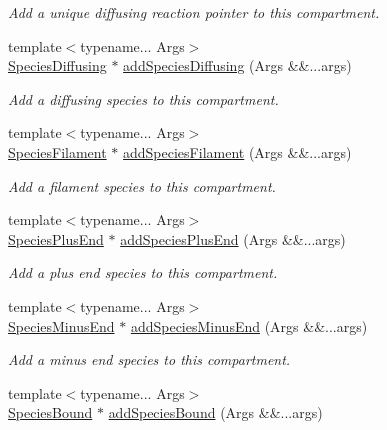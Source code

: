 \begin{DoxyCompactItemize}
\begin{DoxyCompactList}\small\item\em Add a unique diffusing reaction pointer to this compartment. \end{DoxyCompactList}\item 
{\footnotesize template$<$typename... Args$>$ }\\\hyperlink{classSpeciesDiffusing}{Species\+Diffusing} $\ast$ \hyperlink{classCompartment_ac03fcd8679f2ed9e3aebae8732d9ceeb}{add\+Species\+Diffusing} (Args \&\&...args)
\begin{DoxyCompactList}\small\item\em Add a diffusing species to this compartment. \end{DoxyCompactList}\item 
{\footnotesize template$<$typename... Args$>$ }\\\hyperlink{classSpeciesFilament}{Species\+Filament} $\ast$ \hyperlink{classCompartment_a688827f1d21495c14dd57d0c633771ae}{add\+Species\+Filament} (Args \&\&...args)
\begin{DoxyCompactList}\small\item\em Add a filament species to this compartment. \end{DoxyCompactList}\item 
{\footnotesize template$<$typename... Args$>$ }\\\hyperlink{classSpeciesPlusEnd}{Species\+Plus\+End} $\ast$ \hyperlink{classCompartment_a6ce10e213a29c1bd22f5365e251e20f6}{add\+Species\+Plus\+End} (Args \&\&...args)
\begin{DoxyCompactList}\small\item\em Add a plus end species to this compartment. \end{DoxyCompactList}\item 
{\footnotesize template$<$typename... Args$>$ }\\\hyperlink{classSpeciesMinusEnd}{Species\+Minus\+End} $\ast$ \hyperlink{classCompartment_ae62998fd1735861d44e05c108c860f95}{add\+Species\+Minus\+End} (Args \&\&...args)
\begin{DoxyCompactList}\small\item\em Add a minus end species to this compartment. \end{DoxyCompactList}\item 
{\footnotesize template$<$typename... Args$>$ }\\\hyperlink{classSpeciesBound}{Species\+Bound} $\ast$ \hyperlink{classCompartment_a2379ea5d9c4c12b307a5f209dfcbbdd8}{add\+Species\+Bound} (Args \&\&...args)

\end{DoxyCompactItemize}
